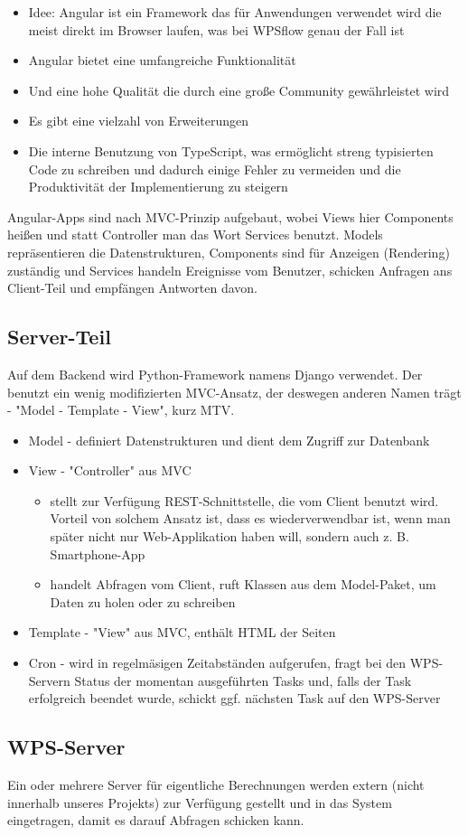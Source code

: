         \begin{itemize}
            \item Idee: Angular ist ein Framework das für Anwendungen verwendet wird die meist direkt im Browser laufen, was bei WPSflow genau der Fall ist
            \item Angular bietet eine umfangreiche Funktionalität
            \item Und eine hohe Qualität die durch eine große Community gewährleistet wird
            \item Es gibt eine vielzahl von Erweiterungen
            \item Die interne Benutzung von TypeScript, was ermöglicht streng typisierten Code zu schreiben und dadurch einige Fehler zu vermeiden und die Produktivität der Implementierung zu steigern
        \end{itemize}

        Angular-Apps sind nach MVC-Prinzip aufgebaut, wobei Views hier Components heißen und statt Controller man das Wort Services benutzt. Models repräsentieren die Datenstrukturen, Components sind für Anzeigen (Rendering) zuständig und Services handeln Ereignisse vom Benutzer, schicken Anfragen ans Client-Teil und empfängen Antworten davon.
        
        \subsection{Server-Teil}
        
        Auf dem Backend wird Python-Framework namens Django verwendet. Der benutzt ein wenig modifizierten MVC-Ansatz, der deswegen anderen Namen trägt - "Model - Template - View", kurz MTV.
        
        \begin{itemize}
            \item Model - definiert Datenstrukturen und dient dem Zugriff zur Datenbank
            \item View - "Controller" aus MVC 
            
            \begin{itemize}
                \item stellt zur Verfügung REST-Schnittstelle, die vom Client benutzt wird. Vorteil von solchem Ansatz ist, dass es wiederverwendbar ist, wenn man später nicht nur Web-Applikation haben will, sondern auch z. B. Smartphone-App
                \item handelt Abfragen vom Client, ruft Klassen aus dem Model-Paket, um Daten zu holen oder zu schreiben
            \end{itemize}
            \item Template - "View" aus MVC, enthält HTML der Seiten 
            \item Cron - wird in regelmäsigen Zeitabständen aufgerufen, fragt bei den WPS-Servern Status der momentan ausgeführten Tasks und, falls der Task erfolgreich beendet wurde, schickt ggf. nächsten Task auf den WPS-Server
        \end{itemize}
        
        \subsection{WPS-Server}
        
        Ein oder mehrere Server für eigentliche Berechnungen werden extern (nicht innerhalb unseres Projekts) zur Verfügung gestellt und in das System eingetragen, damit es darauf Abfragen schicken kann.
    